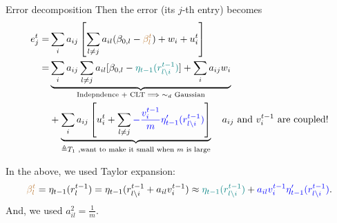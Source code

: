 \documentclass[aspectratio=43, 10pt]{beamer}
\begin{document}
\begin{frame}
    \vspace{-3mm}
        \begin{block}{Error decomposition}
        Then the error (its $j$-th entry) becomes  
        \begin{align}
             e_j^t = & \sum_i a_{ij} \left[ \sum_{l \neq j} a_{il} (\beta_{0,l} - \textcolor{brown}{\beta_l^t}) + w_i + u_i^t \right] \notag \\
            = & \underbrace{\sum_{i}a_{ij} \sum_{l \neq j} a_{il} [\beta_{0,l}-\textcolor{teal}{\eta_{t-1}(r_{l \setminus i}^{t-1})}] + \sum_{i}a_{ij}w_{i}}_{\text{Indepndence + CLT} \implies \sim_d \text{ Gaussian} } \notag  \\ 
            & + \underbrace{\sum_{i}a_{ij} \left[ u_i^{t} 
            +\sum_{l \neq j} \textcolor{blue}{-\frac{v_i^{t-1}}{m}\eta_{t-1}'(r_{l\setminus i}^{t-1})} \right]}_{\triangleq T_1\text{ ,want to make it small when~} m \text{ is large}} \notag \text{   ~~$a_{ij}$ and $v_i^{t-1}$ are coupled!}
        \end{align}
    
        In the above, we used Taylor expansion: 
        $$\textcolor{brown}{\beta_l^t}=\eta_{t-1}(r_l^{t-1}) = \eta_{t-1}(r_{l\setminus i}^{t-1} + a_{il} v_i^{t-1})\approx 
        \textcolor{teal}{\eta_{t-1}(r_{l\setminus i}^{t-1} )} +
        \textcolor{blue}{a_{il}v_i^{t-1} \eta_{t-1}'(r_{l\setminus i}^{t-1})}.
        $$
        And, we used $a_{il}^2 = \frac{1}{m}$. 
        \end{block}
\end{frame}
\end{document}
